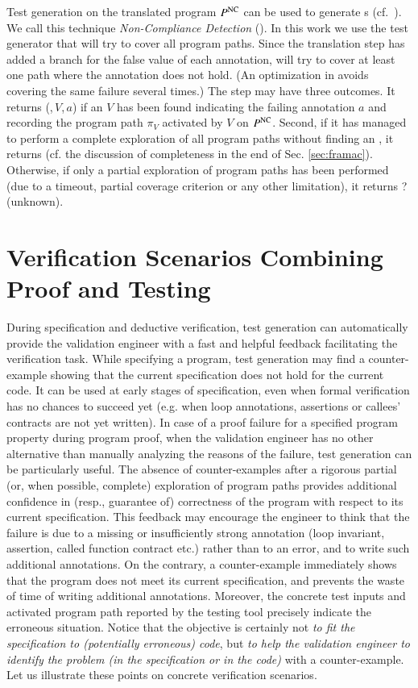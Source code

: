 Test generation on the translated program $P^{\mathrm{NC}}$ 
can be used to generate \NCCE{}s (cf.~\cite{Petiot/SCAM14}).
We call this technique \emph{Non-Compliance Detection} (\NCD).
In this work we use the \pathcrawler test generator that
will try to cover all program paths.
Since the translation step has added a branch for the false
value of each annotation, \pathcrawler will try to cover at
least one path where the annotation does not hold.
(An optimization in \pathcrawler avoids covering the 
same \fassert failure several times.)
The \NCD step may have three outcomes.
It returns (\nc,\,$V$,\,$a$) if an \NCCE $V$ has been found
indicating the failing annotation $a$ and recording
the program path $\pi_V$ activated by $V$ on $P^{\mathrm{NC}}$.
Second, if it has managed to perform a complete exploration 
of all program paths without finding an \NCCE, it returns \no
(cf. the discussion of completeness in the end of Sec. \ref{sec:framac}).
Otherwise, if only a partial exploration of program paths
has been performed (due to a timeout,
partial coverage criterion or any other limitation), it returns 
\textsf{?} (unknown).


\section{Verification Scenarios Combining Proof and Testing}
\label{sec:scenarios}


During specification and deductive
verification, test generation  can automatically provide the
validation engineer with a fast and helpful feedback facilitating the
verification task. While specifying a program, test generation
may find a counter-example showing that the current specification does not hold
for the current code. It can be used at early stages of specification,
even when formal verification has no chances to succeed yet (e.g. when loop
annotations, assertions or callees' contracts are not yet written).
In case of a proof failure for a specified program
property during program proof, when the validation engineer has no other
alternative than manually analyzing the reasons of the failure, test generation 
can be particularly useful. The absence of counter-examples after a rigorous
partial (or, when possible, complete) exploration of program paths provides
additional confidence in (resp., guarantee of) correctness of the
program with respect to its current specification. This feedback may encourage
the engineer to think that the failure is due to a missing or insufficiently
strong annotation (loop invariant, assertion, called function contract etc.) 
rather than to an error,
and to write such additional annotations. On the contrary, a counter-example
immediately shows that the program does not meet its current specification, and
prevents the waste of time of writing additional annotations. Moreover, the
concrete test inputs and activated program path reported by the testing
tool precisely indicate the erroneous situation.
Notice that the objective is certainly not \emph{to fit the specification to
(potentially erroneous) code}, but \emph{to help the validation engineer
to identify the problem (in the specification or in the code)}
with a counter-example. 
Let us illustrate these points on concrete verification scenarios.

